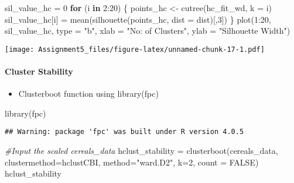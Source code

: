 \documentclass[
]{article}
\newenvironment{Shaded}{\begin{snugshade}}{\end{snugshade}}
\newcommand{\AttributeTok}[1]{\textcolor[rgb]{0.77,0.63,0.00}{#1}}
\newcommand{\CommentTok}[1]{\textcolor[rgb]{0.56,0.35,0.01}{\textit{#1}}}
\newcommand{\ConstantTok}[1]{\textcolor[rgb]{0.00,0.00,0.00}{#1}}
\newcommand{\ControlFlowTok}[1]{\textcolor[rgb]{0.13,0.29,0.53}{\textbf{#1}}}
\newcommand{\DecValTok}[1]{\textcolor[rgb]{0.00,0.00,0.81}{#1}}
\newcommand{\FunctionTok}[1]{\textcolor[rgb]{0.00,0.00,0.00}{#1}}
\newcommand{\NormalTok}[1]{#1}
\newcommand{\OtherTok}[1]{\textcolor[rgb]{0.56,0.35,0.01}{#1}}
\newcommand{\SpecialCharTok}[1]{\textcolor[rgb]{0.00,0.00,0.00}{#1}}
\newcommand{\StringTok}[1]{\textcolor[rgb]{0.31,0.60,0.02}{#1}}
\providecommand{\tightlist}{%
  \setlength{\itemsep}{0pt}\setlength{\parskip}{0pt}}
\begin{document}
\begin{Shaded}
\begin{Highlighting}[]
\NormalTok{sil\_value\_hc }\OtherTok{=} \DecValTok{0}
\ControlFlowTok{for}\NormalTok{ (i }\ControlFlowTok{in} \DecValTok{2}\SpecialCharTok{:}\DecValTok{20}\NormalTok{) \{}
\NormalTok{  points\_hc }\OtherTok{\textless{}{-}} \FunctionTok{cutree}\NormalTok{(hc\_fit\_wd, }\AttributeTok{k =}\NormalTok{ i)}
\NormalTok{  sil\_value\_hc[i] }\OtherTok{=} \FunctionTok{mean}\NormalTok{(}\FunctionTok{silhouette}\NormalTok{(points\_hc, }\AttributeTok{dist =}\NormalTok{ dist)[,}\DecValTok{3}\NormalTok{])}
\NormalTok{\}}
\FunctionTok{plot}\NormalTok{(}\DecValTok{1}\SpecialCharTok{:}\DecValTok{20}\NormalTok{, sil\_value\_hc, }\AttributeTok{type =} \StringTok{"b"}\NormalTok{, }\AttributeTok{xlab =} \StringTok{"No: of Clusters"}\NormalTok{, }\AttributeTok{ylab =} \StringTok{"Silhouette Width"}\NormalTok{)}
\end{Highlighting}
\end{Shaded}

\texttt{[image: Assignment5\_files/figure-latex/unnamed-chunk-17-1.pdf]}

\hypertarget{cluster-stability}{%
\paragraph{Cluster Stability}\label{cluster-stability}}

\begin{itemize}
\tightlist
\item
  Clusterboot function using library(fpc)
\end{itemize}

\begin{Shaded}
\begin{Highlighting}[]
\FunctionTok{library}\NormalTok{(fpc)}
\end{Highlighting}
\end{Shaded}

\begin{verbatim}
## Warning: package 'fpc' was built under R version 4.0.5
\end{verbatim}

\begin{Shaded}
\begin{Highlighting}[]
\CommentTok{\#Input the scaled cereals\_data}
\NormalTok{hclust\_stability }\OtherTok{=} \FunctionTok{clusterboot}\NormalTok{(cereals\_data, }\AttributeTok{clustermethod=}\NormalTok{hclustCBI, }\AttributeTok{method=}\StringTok{"ward.D2"}\NormalTok{, }\AttributeTok{k=}\DecValTok{2}\NormalTok{, }\AttributeTok{count =} \ConstantTok{FALSE}\NormalTok{)}
\NormalTok{hclust\_stability}
\end{Highlighting}
\end{Shaded}
\end{document}
